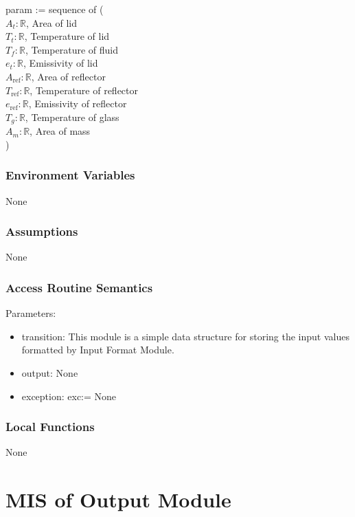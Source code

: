 \documentclass[12pt, titlepage]{article}
\begin{document}
param := sequence of ( \\
$A_t: \mathbb{R}$, Area of lid \\
$T_t: \mathbb{R}$, Temperature of lid \\ 
$T_f: \mathbb{R}$, Temperature of fluid \\
$e_t: \mathbb{R}$, Emissivity of lid \\
$A_\text{ref}: \mathbb{R}$, Area of reflector \\
$T_\text{ref}: \mathbb{R}$, Temperature of reflector  \\
$e_\text{ref}: \mathbb{R}$, Emissivity of reflector  \\
$T_g: \mathbb{R}$, Temperature of glass   \\ 
$A_m: \mathbb{R}$, Area of mass 
\\ )

\subsubsection{Environment Variables}

None

\subsubsection{Assumptions}

None

\subsubsection{Access Routine Semantics}

\noindent Parameters:
\begin{itemize}
\item transition: This module is a simple data structure for storing the input values formatted by Input Format Module. 
\item output: None
\item exception: exc:= None
\end{itemize}


\subsubsection{Local Functions}

None

\newpage
\section{MIS of Output Module} \label{Output_Format_Module}
\end{document}
